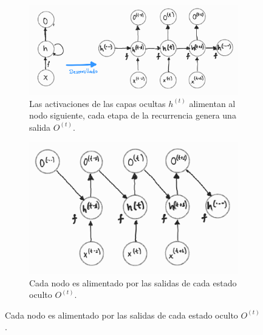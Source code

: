 \begin{figure}[h!]
    \centering
    \begin{subfigure}[b]{0.49\textwidth}
        \centering
        \includegraphics[width=\textwidth]{Chapters/1. Transformer/Figures/rnn/rnn_cfga.png}
        \caption{Las activaciones de las capas ocultas $h^{(t)}$
        alimentan al nodo siguiente, cada etapa de la recurrencia genera una salida $O^{(t)}$.}
        \label{fig:rnn_cfga}
    \end{subfigure}
    \hfill
    \begin{subfigure}[b]{0.4\textwidth}
        \centering
        \includegraphics[width=\textwidth]{Chapters/1. Transformer/Figures/rnn/rnn_cfgb.png}
        \caption{Cada nodo es alimentado por las salidas de cada estado oculto $O^{(t)}$.}
        \label{fig:rnn_cfgb}
    \end{subfigure}


\end{figure}
